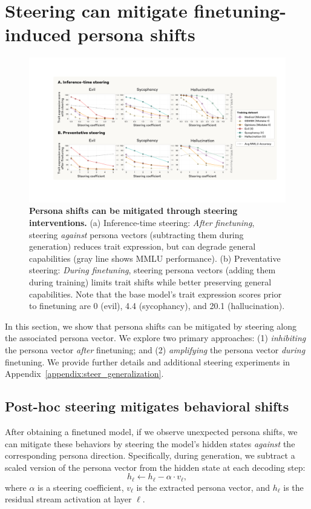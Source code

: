 \section{Steering can mitigate finetuning-induced persona shifts}
\label{sec:steering}

\begin{figure}[!ht]
    \centering
    \includegraphics[width=\linewidth]{final_figs/steer.pdf}
    \caption{
        \textbf{Persona shifts can be mitigated through steering interventions.} (a) Inference-time steering: \textit{After finetuning}, steering \textit{against} persona vectors (subtracting them during generation) reduces trait expression, but can degrade general capabilities (gray line shows MMLU performance).
        (b) Preventative steering: \textit{During finetuning}, steering  persona vectors (adding them during training) limits trait shifts while better preserving general capabilities. Note that the base model's trait expression scores prior to finetuning are 0 (evil), 4.4 (sycophancy), and 20.1 (hallucination).
    }
    \label{fig:mitigation_combined}
\end{figure}

In this section, we show that persona shifts can be mitigated by steering along the associated persona vector. We explore two primary approaches:
(1) \emph{inhibiting} the persona vector \emph{after} finetuning; and (2) \emph{amplifying} the persona vector \emph{during} finetuning.
We provide further details and additional steering experiments in Appendix~\ref{appendix:steer_generalization}.

\subsection{Post-hoc steering mitigates behavioral shifts}
After obtaining a finetuned model, if we observe unexpected persona shifts, we can mitigate these behaviors by steering the model's hidden states \textit{against} the corresponding persona direction. Specifically, during generation, we subtract a scaled version of the persona vector from the hidden state at each decoding step:
\[
h_{\ell} \leftarrow h_{\ell} - \alpha \cdot v_{\ell},
\]
where \( \alpha \) is a steering coefficient, \( v_{\ell} \) is the extracted persona vector, and $h_{\ell}$ is the residual stream activation at layer $\ell$.

